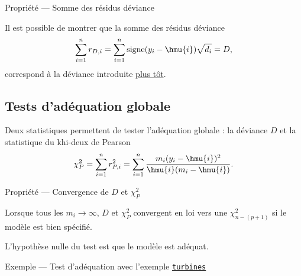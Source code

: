 \documentclass[
  french,
  letterpaper,
  DIV=11,
  numbers=noendperiod]{scrreprt}
\begin{document}
{Propriété --- Somme des résidus déviance}

Il est possible de montrer que la somme des résidus déviance
\[\sum_{i=1}^nr_{D,i} = \sum_{i=1}^n\mathrm{signe}(y_i - \hmu{i})\sqrt{d_i}=D,\]
correspond à la déviance introduite \hyperref[sec-deviance]{plus tôt}.

\subsection{Tests d'adéquation
globale}\label{tests-daduxe9quation-globale}

Deux statistiques permettent de tester l'adéquation globale : la
déviance \(D\) et la statistique du khi-deux de Pearson
\[\chi^2_P = \sum_{i=1}^n r_{P,i}^2 = \sum_{i=1}^n \frac{m_i(y_i - \hmu{i})^2}{\hmu{i}(m_i - \hmu{i})}.\]

{Propriété --- Convergence de \(D\) et \(\chi^2_P\)}

Lorsque tous les \(m_i \to \infty\), \(D\) et \(\chi^2_P\) convergent en
loi vers une \(\chi^2_{n-(p+1)}\) si le modèle est bien spécifié.

L'hypothèse nulle du test est que le modèle est adéquat.

{Exemple --- Test d'adéquation avec l'exemple
\hyperref[data-turbines]{\texttt{turbines}}}
\end{document}
